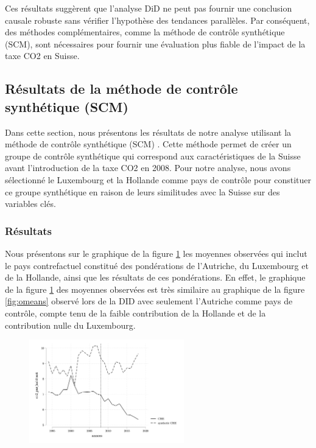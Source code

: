 Ces résultats suggèrent que l'analyse DiD ne peut pas fournir une conclusion causale robuste sans vérifier l'hypothèse des tendances parallèles. Par conséquent, des méthodes complémentaires, comme la méthode de contrôle synthétique (SCM), sont nécessaires pour fournir une évaluation plus fiable de l'impact de la taxe CO2 en Suisse.


\subsection{Résultats de la méthode de contrôle synthétique (SCM)}
\label{subsec:results_scm}

Dans cette section, nous présentons les résultats de notre analyse utilisant la méthode de contrôle synthétique (SCM)  . Cette méthode permet de créer un groupe de contrôle synthétique qui correspond aux caractéristiques de la Suisse avant l'introduction de la taxe CO2 en 2008. Pour notre analyse, nous avons sélectionné le Luxembourg et la Hollande comme pays de contrôle pour constituer ce groupe synthétique en raison de leurs similitudes avec la Suisse sur des variables clés.

\subsubsection{Résultats}
\label{subsec:results_scm_graph_table}

Nous présentons sur le graphique de la figure \ref{fig:scm_omeans} les moyennes observées qui inclut le pays contrefactuel constitué des pondérations de l'Autriche, du Luxembourg et de la Hollande, ainsi que les résultats de ces pondérations. En effet, le graphique de la figure \ref{fig:scm_omeans} des moyennes observées est très similaire au graphique de la figure \ref{fig:omeans} observé lors de la DID avec seulement l'Autriche comme pays de contrôle, compte tenu de la faible contribution de la Hollande et de la contribution nulle du Luxembourg.


\begin{figure}[H]
\centering
\includegraphics[width=0.6\textwidth]{Article/images/scm_omeans.png}
\caption{}
\label{fig:scm_omeans}
    \end{figure}


